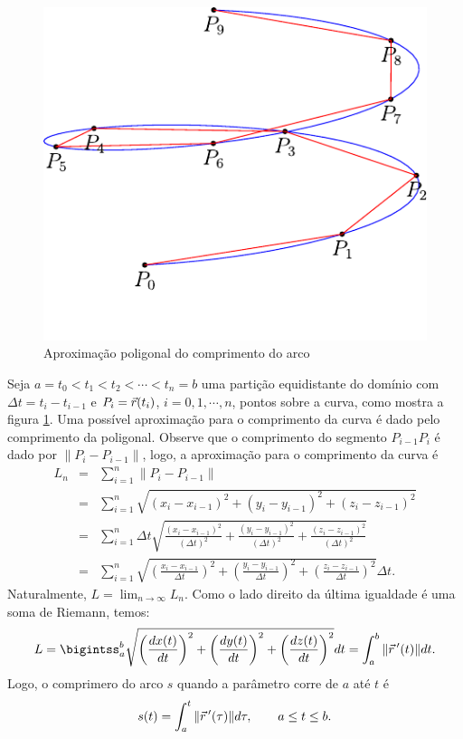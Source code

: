 \begin{figure}
\centering
    \includegraphics{./cap_curvas/pics/helice_retificacao}
\caption{Aproximação poligonal do comprimento do arco}\label{fig_compr_arc}
\end{figure}

 
 
Seja $a=t_0<t_1<t_2<\cdots<t_n=b $ uma partição equidistante do domínio com $\Delta t=t_i-t_{i-1}$ e $P_i=\vec{r}(t_i)$, $i=0,1,\cdots,n$, pontos sobre a curva, como mostra a figura \ref{fig_compr_arc}. Uma possível aproximação para o comprimento da curva é dado pelo comprimento da poligonal. Observe que o comprimento do segmento $P_{i-1}P_i$ é dado por $\|P_i-P_{i-1}\|$, logo, a aproximação para o comprimento da curva é
\begin{eqnarray*}
L_n&=&\sum_{i=1}^n\|P_i-P_{i-1}\|\\
&=&\sum_{i=1}^n \sqrt{(x_i-x_{i-1})^2+(y_i-y_{i-1})^2+(z_i-z_{i-1})^2}\\
&=&\sum_{i=1}^n \Delta t \sqrt{\frac{(x_i-x_{i-1})^2}{(\Delta t) ^2}+\frac{(y_i-y_{i-1})^2}{(\Delta t) ^2}+\frac{(z_i-z_{i-1})^2}{(\Delta t) ^2}}\\
&=&\sum_{i=1}^n \sqrt{\left(\frac{x_i-x_{i-1}}{\Delta t }\right)^2+\left(\frac{y_i-y_{i-1}}{\Delta t}\right)^2+\left(\frac{z_i-z_{i-1}}{\Delta t}\right)^2}\Delta t.
\end{eqnarray*}
Naturalmente, $L=\lim_{n\to\infty }L_n$. Como o lado direito da última igualdade é uma soma de Riemann, temos:
\begin{equation}\label{defcomparco}
L=\bigintss_{a}^{b} \sqrt{\left(\frac{dx(t)}{dt}\right)^2+\left(\frac{dy(t)}{dt}\right)^2+\left(\frac{dz(t)}{dt}\right)^2}dt=\int_{a}^{b}\|\vct{r}\!~'(t)\|dt.
\end{equation}
Logo, o comprimero do arco $s$ quando a parâmetro corre de $a$ até $t$ é
\begin{equation}\label{defcomparco_1}
s(t)=\int_{a}^{t}\|\vec{r}\!~'(\tau)\|d\tau,\qquad a\leq t\leq b.
\end{equation}

